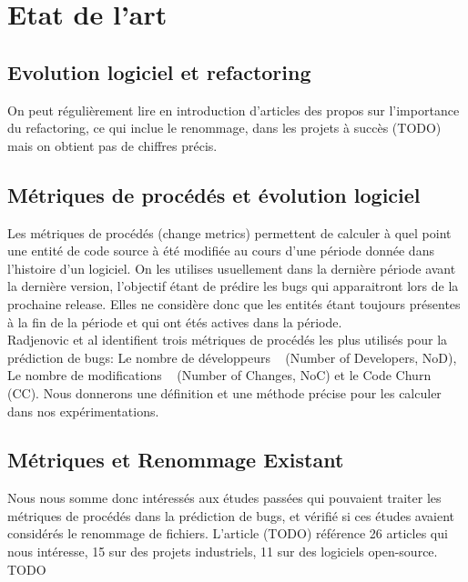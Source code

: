\section{Etat de l'art}
\label{sec:etat_de_lart}

\subsection{Evolution logiciel et refactoring}
On peut régulièrement lire en introduction d'articles des propos sur l'importance du refactoring, ce qui inclue le renommage, dans les projets à succès (TODO) mais on obtient pas de chiffres précis.\\

\subsection{Métriques de procédés et évolution logiciel}
Les métriques de procédés (change metrics) permettent de calculer à quel point une entité de code source à été modifiée au cours d'une période donnée dans l'histoire d'un logiciel. On les utilises usuellement dans la dernière période avant la dernière version, l'objectif étant de prédire les bugs qui apparaitront lors de la prochaine release. Elles ne considère donc que les entités étant toujours présentes à la fin de la période et qui ont étés actives dans la période.\\
Radjenovic et al \cite{radjenovic_software_2013} identifient trois métriques de procédés les plus utilisés pour la prédiction de bugs: Le nombre de développeurs ~\cite{weyuker_too_2008} (Number of Developers, NoD), Le nombre de modifications ~\cite{graves_predicting_2000} (Number of Changes, NoC) et le Code Churn ~\cite{munson_code_1998} (CC). Nous donnerons une définition et une méthode précise pour les calculer dans nos expérimentations.\\

\subsection{Métriques et Renommage Existant}
Nous nous somme donc intéressés aux études passées qui pouvaient traiter les métriques de procédés dans la prédiction de bugs, et vérifié si ces études avaient considérés le renommage de fichiers. L'article (TODO) référence 26 articles qui nous intéresse, 15 sur des projets industriels, 11 sur des logiciels open-source. TODO \\

